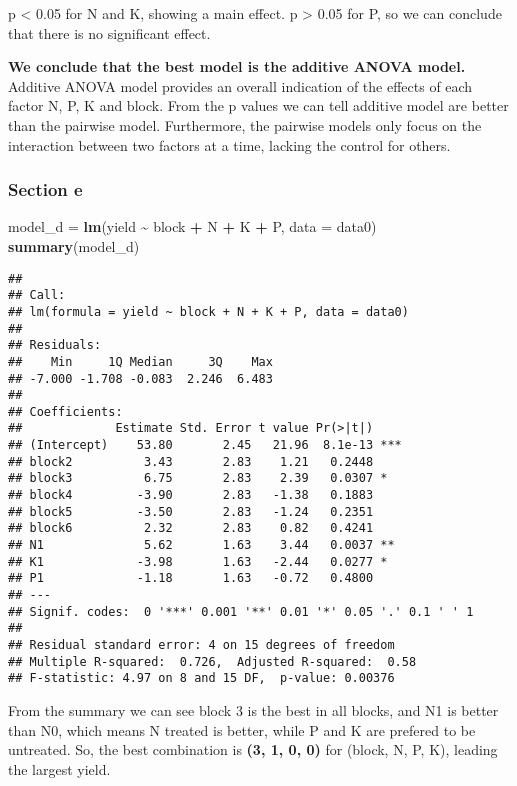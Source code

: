 \documentclass[
]{article}
\newenvironment{Shaded}{\begin{snugshade}}{\end{snugshade}}
\newcommand{\AttributeTok}[1]{\textcolor[rgb]{0.13,0.29,0.53}{#1}}
\newcommand{\FunctionTok}[1]{\textcolor[rgb]{0.13,0.29,0.53}{\textbf{#1}}}
\newcommand{\NormalTok}[1]{#1}
\newcommand{\OtherTok}[1]{\textcolor[rgb]{0.56,0.35,0.01}{#1}}
\newcommand{\SpecialCharTok}[1]{\textcolor[rgb]{0.81,0.36,0.00}{\textbf{#1}}}
\begin{document}
p \textless{} 0.05 for N and K, showing a main effect. p \textgreater{}
0.05 for P, so we can conclude that there is no significant effect.

\textbf{We conclude that the best model is the additive ANOVA model.}
Additive ANOVA model provides an overall indication of the effects of
each factor N, P, K and block. From the p values we can tell additive
model are better than the pairwise model. Furthermore, the pairwise
models only focus on the interaction between two factors at a time,
lacking the control for others.

\subsubsection{Section e}\label{section-e}

\begin{Shaded}
\begin{Highlighting}[]
\NormalTok{model\_d }\OtherTok{=} \FunctionTok{lm}\NormalTok{(yield }\SpecialCharTok{\textasciitilde{}}\NormalTok{ block }\SpecialCharTok{+}\NormalTok{ N }\SpecialCharTok{+}\NormalTok{ K }\SpecialCharTok{+}\NormalTok{ P, }\AttributeTok{data =}\NormalTok{ data0)}
\FunctionTok{summary}\NormalTok{(model\_d)}
\end{Highlighting}
\end{Shaded}

\begin{verbatim}
## 
## Call:
## lm(formula = yield ~ block + N + K + P, data = data0)
## 
## Residuals:
##    Min     1Q Median     3Q    Max 
## -7.000 -1.708 -0.083  2.246  6.483 
## 
## Coefficients:
##             Estimate Std. Error t value Pr(>|t|)    
## (Intercept)    53.80       2.45   21.96  8.1e-13 ***
## block2          3.43       2.83    1.21   0.2448    
## block3          6.75       2.83    2.39   0.0307 *  
## block4         -3.90       2.83   -1.38   0.1883    
## block5         -3.50       2.83   -1.24   0.2351    
## block6          2.32       2.83    0.82   0.4241    
## N1              5.62       1.63    3.44   0.0037 ** 
## K1             -3.98       1.63   -2.44   0.0277 *  
## P1             -1.18       1.63   -0.72   0.4800    
## ---
## Signif. codes:  0 '***' 0.001 '**' 0.01 '*' 0.05 '.' 0.1 ' ' 1
## 
## Residual standard error: 4 on 15 degrees of freedom
## Multiple R-squared:  0.726,  Adjusted R-squared:  0.58 
## F-statistic: 4.97 on 8 and 15 DF,  p-value: 0.00376
\end{verbatim}

From the summary we can see block 3 is the best in all blocks, and N1 is
better than N0, which means N treated is better, while P and K are
prefered to be untreated. So, the best combination is \textbf{(3, 1, 0,
0)} for (block, N, P, K), leading the largest yield.
\end{document}
